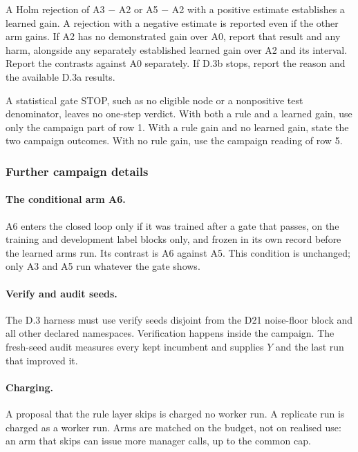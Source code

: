 A Holm rejection of A3 $-$ A2 or A5 $-$ A2 with a positive estimate establishes a learned gain. A rejection with a negative estimate is reported even if the other arm gains. If A2 has no demonstrated gain over A0, report that result and any harm, alongside any separately established learned gain over A2 and its interval. Report the contrasts against A0 separately. If D.3b stops, report the reason and the available D.3a results.

A statistical gate STOP, such as no eligible node or a nonpositive test denominator, leaves no one-step verdict. With both a rule and a learned gain, use only the campaign part of row 1. With a rule gain and no learned gain, state the two campaign outcomes. With no rule gain, use the campaign reading of row 5.

\subsubsection{Further campaign details}

\paragraph{The conditional arm A6.}
A6 enters the closed loop only if it was trained after a gate that passes, on the training and development label blocks only, and frozen in its own record before the learned arms run. Its contrast is A6 against A5. This condition is unchanged; only A3 and A5 run whatever the gate shows.

\paragraph{Verify and audit seeds.}
The D.3 harness must use verify seeds disjoint from the D21 noise-floor block and all other declared namespaces. Verification happens inside the campaign. The fresh-seed audit measures every kept incumbent and supplies $Y$ and the last run that improved it. 

\paragraph{Charging.}
A proposal that the rule layer skips is charged no worker run. A replicate run is charged as a worker run. Arms are matched on the budget, not on realised use: an arm that skips can issue more manager calls, up to the common cap. 

